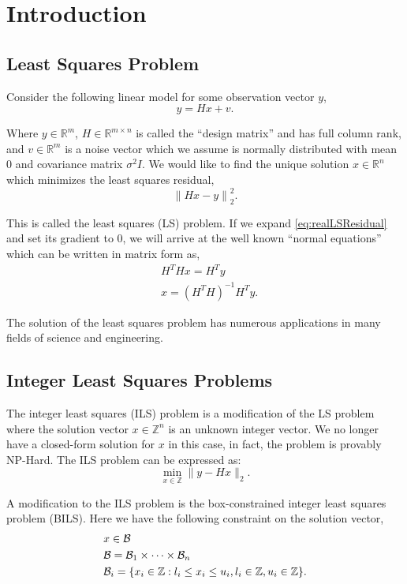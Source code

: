 \documentclass[12pt,Bold,letterpaper]{mcgilletdclass}
\newcommand{\be}{\begin{equation}}
\newcommand{\ee}{\end{equation}}
\newcommand{\boxcon}{{\cal B}}
\newcommand{\vsp}{\vspace{\baselineskip}}
\begin{document}
 
\chapter{Introduction}
\section{Least Squares Problem}
Consider the following linear model for some observation vector $y$,
\begin{equation}
\label{eq:realLSModel}
y = Hx+v.
\end{equation}

Where $y\in\mathbb{R}^m$, $H\in\mathbb{R}^{m \times n}$ is called the
``design matrix'' and has full column rank, and $v\in\mathbb{R}^m$ is a
noise vector which we assume is normally distributed with mean $0$ and
covariance matrix $\sigma^2I$. We would like to find the unique solution
$x\in\mathbb{R}^n$ which minimizes the least squares residual,
\be
\label{eq:realLSResidual}
 \left \| Hx - y \right \|^2_2.
\ee

This is called the least squares (LS) problem. If we expand
\eqref{eq:realLSResidual} and set its gradient to $0$, we will arrive at the
well known ``normal equations'' which can be written in matrix form as,
\begin{align}
&H^THx = H^Ty \\
\label{eq:normalEquations}
&x = (H^TH)^{-1}H^Ty.
\end{align}

The solution of the least squares problem has numerous applications in many fields of science and engineering.

\vsp \section{Integer Least Squares Problems}
The integer least squares (ILS) problem is a modification of the LS problem
where the solution vector $x\in\mathbb{Z}^n$ is an unknown integer vector. We
no longer have a closed-form solution for $x$ in this case, in fact, the
problem is provably NP-Hard. The ILS problem can be expressed as:
\be
\label{eq:ils0}
\min_{x\in {\mathbb{Z} }}  \| y- Hx \|_2. 
\ee

A modification to the ILS problem is the box-constrained integer least squares
problem (BILS). Here we have the following constraint on the solution
vector, 
\begin{align} \label{eq:boxCon}
&x\in \boxcon\\
&{\cal B} = {\cal B}_1  \times \cdots \times {\cal B}_n\\
&\boxcon_i = \{x_i\in\mathbb{Z} : l_i\le x_i \le u_i, l_i\in \mathbb{Z},
u_i\in\mathbb{Z} \}.
\end{align}
\end{document}
